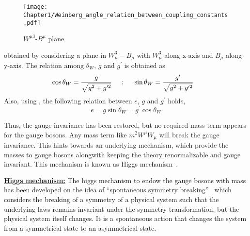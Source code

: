 \hfill
\begin{minipage}{0.35\textwidth}
  \begin{figure}[H]
    \texttt{[image: Chapter1/Weinberg\_angle\_relation\_between\_coupling\_constants.pdf]}
    \caption{\label{fig:Weinberg_angle} $W^{{\mu}3}$-$B^{\mu}$ plane}
  \end{figure}
\end{minipage}

\noindent obtained by considering a plane in $W_{\mu}^{3}-B_{\mu}$ with $W_{\mu}^{3}$ along x-axis and $B_{\mu}$ along y-axis. The relation among
$\theta_{W}$, $g$ and $g^{\prime}$ is obtained as 
\begin{equation}
  \begin{split}
& \cos{\theta_{W}} = \frac{g}{\sqrt{g^{2} + g^{{\prime}2}}} \hspace{0.2in} ; \hspace{0.2in} \sin{\theta_{W}} = \frac{g^{\prime}}{\sqrt{g^{2} + g^{{\prime}2}}}
  \label{eg:theta_w}
  \end{split}
\end{equation}
Also, using \eqn{\ref{eg:EWK_jmu_all}}, the following relation between $e$, $g$ and $g^{\prime}$ holds,
\begin{equation}
e = g\sin{\theta_{W}} = g^{\prime}\cos{\theta_{W}}
\label{eg:e_g_gprime}
\end{equation}

Thus, the gauge invariance has been restored, but no required mass term appears for the gauge bosons.
Any mass term like $m^{2}W^{\mu}W_{\mu}$ will break the gauge invariance. This hints towards an underlying mechanism,
which provide the masses to gauge bosons alongwith keeping the theory renormalizable and gauge invariant. This mechanism is
known as Higgs mechanism~\cite{Higgs:1964ia, Higgs:1964pj, Higgs:1966ev, Englert:1964et, Guralnik:1964eu}.

\noindent
\underline{\bf{Higgs mechanism:}} The higgs mechanism to endow the gauge bosons with mass has been developed on the idea of
``spontaneous symmetry breaking''~\cite{Djouadi:2005gi} which considers the breaking of a symmetry of a physical system such that
the underlying laws remains invariant under the symmetry transformation, but the physical system itself changes. It is a spontaneous
action that changes the system from a symmetrical state to an asymmetrical state.  

